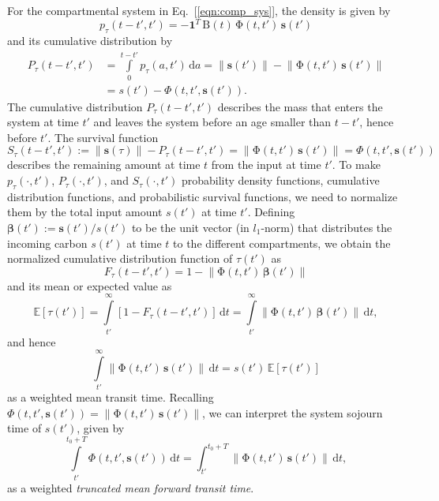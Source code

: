 \documentclass[9pt,twoside]{pnas-new}
\newcommand{\intl}{\int\limits}
\newcommand{\dd}[1]{\,\mathrm{d}#1}
\renewcommand{\vec}[1]{\mathbf{#1}}
\newcommand{\tens}[1]{\mathrm{#1}}
\newcommand{\itPhi}{\mathit{\Phi}}
\newcommand{\noEqref}[1]{[\ref{#1}]}
\newcommand{\vnorm}[1]{\left\|#1\right\|}
\begin{document}
For the compartmental system in Eq.~\noEqref{eqn:comp_sys}, the density is given by
\begin{equation}
    p_\tau(t-t', t') = -\vec{1}^T\,\tens{B}(t)\,\tens{\Phi}(t, t')\,\vec{s}(t')
\end{equation}
and its cumulative distribution by
\begin{equation}
    \begin{aligned}
        P_\tau(t-t',t') &= \intl_0^{t-t'} p_\tau(a, t')\dd{a} = \vnorm{\vec{s}(t')} - \vnorm{\tens{\Phi}(t,t')\,\vec{s}(t')} \\
        &= s(t') - \itPhi(t,t',\vec{s}(t')).
    \end{aligned}
\end{equation}
The cumulative distribution $P_\tau(t-t',t')$ describes the mass that enters the system at time $t'$ and leaves the system before an age smaller than $t-t'$, hence before $t'$.
The survival function
\begin{equation}
    S_\tau(t-t',t'):=\vnorm{\vec{s}(\tau)} - P_\tau(t-t',t') = \vnorm{\tens{\Phi}(t,t')\,\vec{s}(t')} = \itPhi(t,t',\vec{s}(t'))
\end{equation}
describes the remaining amount at time $t$ from the input at time $t'$.
To make $p_\tau(\cdot,t')$, $P_\tau(\cdot,t')$, and $S_\tau(\cdot,t')$ probability density functions, cumulative distribution functions, and probabilistic survival functions, we need to normalize them by the total input amount $s(t')$ at time $t'$.
Defining $\vec{\beta}(t'):=\vec{s}(t')/s(t')$ to be the unit vector (in $l_1$-norm) that distributes the incoming carbon $s(t')$ at time $t$ to the different compartments, we obtain the normalized cumulative distribution function of $\tau(t')$ as
\begin{equation}
    F_\tau(t-t',t') = 1 - \vnorm{\tens{\Phi}(t,t')\,\vec{\beta}(t')}
\end{equation}
and its mean or expected value as
\begin{equation}
    \mathbb{E}\left[\tau(t')\right] = \intl_{t'}^\infty \left[1-F_\tau(t-t',t')\right]\dd{t} = \intl_{t'}^\infty \vnorm{\tens{\Phi}(t,t')\,\vec{\beta}(t')}\dd{t},
\end{equation}
and hence
\begin{equation}
    \intl_{t'}^\infty \vnorm{\tens{\Phi}(t,t')\,\vec{s}(t')}\dd{t} = s(t')\,\mathbb{E}\left[\tau(t')\right]
\end{equation}
as a weighted mean transit time.
Recalling $\itPhi(t,t',\vec{s}(t'))=\vnorm{\tens{\Phi}(t,t')\,\vec{s}(t')}$, we can interpret the system sojourn time of
$s(t')$, given by
\begin{equation}
    \intl_{t'}^{t_0+T} \itPhi(t,t',\vec{s}(t'))\dd{t} = \int_{t'}^{t_0+T} \vnorm{\tens{\Phi}(t,t')\,\vec{s}(t')}\dd{t},
\end{equation}
as a weighted \emph{truncated mean forward transit time}.
\end{document}
